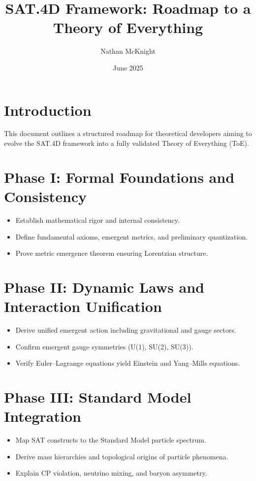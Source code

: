 \documentclass{article}
\title{SAT.4D Framework: Roadmap to a Theory of Everything}
\author{Nathan McKnight}
\date{June 2025}
\begin{document}
\maketitle

\section*{Introduction}
This document outlines a structured roadmap for theoretical developers aiming to evolve the SAT.4D framework into a fully validated Theory of Everything (ToE).

\section{Phase I: Formal Foundations and Consistency}
\begin{itemize}
    \item Establish mathematical rigor and internal consistency.
    \item Define fundamental axioms, emergent metrics, and preliminary quantization.
    \item Prove metric emergence theorem ensuring Lorentzian structure.
\end{itemize}

\section{Phase II: Dynamic Laws and Interaction Unification}
\begin{itemize}
    \item Derive unified emergent action including gravitational and gauge sectors.
    \item Confirm emergent gauge symmetries (U(1), SU(2), SU(3)).
    \item Verify Euler–Lagrange equations yield Einstein and Yang–Mills equations.
\end{itemize}

\section{Phase III: Standard Model Integration}
\begin{itemize}
    \item Map SAT constructs to the Standard Model particle spectrum.
    \item Derive mass hierarchies and topological origins of particle phenomena.
    \item Explain CP violation, neutrino mixing, and baryon asymmetry.
\end{itemize}
\end{document}
